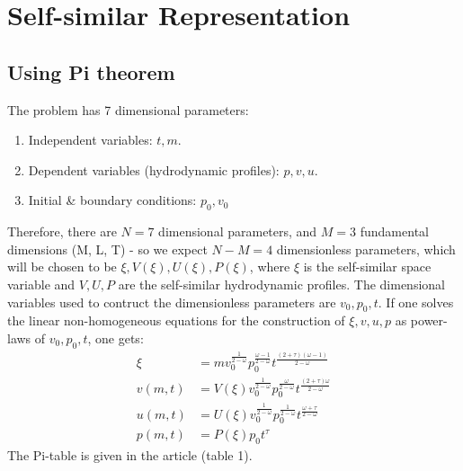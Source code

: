 \documentclass[11pt]{article}
\begin{document}
\section{Self-similar Representation}
\subsection{Using Pi theorem}
The problem has 7 dimensional parameters:
\begin{enumerate}
  \item Independent variables: $t, m$.
  \item Dependent variables (hydrodynamic profiles): $p, v, u$.
  \item Initial \& boundary conditions: $p_0, v_0$
\end{enumerate}
Therefore, there are $N=7$ dimensional parameters, and $M=3$ fundamental dimensions (M, L, T) - so we expect $N-M=4$ dimensionless parameters, which will be chosen to be $\xi, V(\xi), U(\xi), P(\xi)$, where $\xi$ is the self-similar space variable and $V, U, P$ are the self-similar hydrodynamic profiles. The dimensional variables used to contruct the dimensionless parameters are $v_0, p_0, t$. If one solves the linear non-homogeneous equations for the construction of $\xi, v, u, p$ as power-laws of $v_0, p_0, t$, one gets:
\begin{align}
   \xi &= m v_0^{\frac{1}{2-\omega}} p_0^{\frac{\omega-1}{2-\omega}} t^{\frac{(2+\tau)(\omega - 1)}{2-\omega}} \\
    v(m,t) &=  V(\xi) v_0^{\frac{1}{2-\omega}} p_0^{\frac{\omega}{2-\omega}} t^{\frac{(2+\tau)\omega}{2-\omega}} \\
    u(m,t) &= U(\xi) v_0^{\frac{1}{2-\omega}} p_0^{\frac{1}{2-\omega}} t^{\frac{\omega + \tau}{2-\omega}} \\
    p(m,t) &= P(\xi) p_0 t^\tau
\end{align}
The Pi-table is given in the article (table 1).
\end{document}
